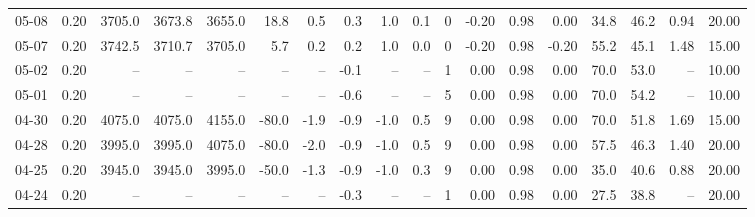 \begin{threeparttable}
{\begin{tabular}{lrrrrrrrrrrrrrrrrr}
  05-08 &     0.20 & 3705.0 & 3673.8 & 3655.0 &       18.8 &            0.5 &                       0.3 &                      1.0 &                 0.1 &              0 &      -0.20 &      0.98 &           0.00 &             34.8 &                46.2 &            0.94 &                  20.00 \\
  05-07 &     0.20 & 3742.5 & 3710.7 & 3705.0 &        5.7 &            0.2 &                       0.2 &                      1.0 &                 0.0 &              0 &      -0.20 &      0.98 &          -0.20 &             55.2 &                45.1 &            1.48 &                  15.00 \\
  05-02 &     0.20 &     -- &     -- &     -- &         -- &             -- &                      -0.1 &                       -- &                  -- &              1 &       0.00 &      0.98 &           0.00 &             70.0 &                53.0 &              -- &                  10.00 \\
  05-01 &     0.20 &     -- &     -- &     -- &         -- &             -- &                      -0.6 &                       -- &                  -- &              5 &       0.00 &      0.98 &           0.00 &             70.0 &                54.2 &              -- &                  10.00 \\
  04-30 &     0.20 & 4075.0 & 4075.0 & 4155.0 &      -80.0 &           -1.9 &                      -0.9 &                     -1.0 &                 0.5 &              9 &       0.00 &      0.98 &           0.00 &             70.0 &                51.8 &            1.69 &                  15.00 \\
  04-28 &     0.20 & 3995.0 & 3995.0 & 4075.0 &      -80.0 &           -2.0 &                      -0.9 &                     -1.0 &                 0.5 &              9 &       0.00 &      0.98 &           0.00 &             57.5 &                46.3 &            1.40 &                  20.00 \\
  04-25 &     0.20 & 3945.0 & 3945.0 & 3995.0 &      -50.0 &           -1.3 &                      -0.9 &                     -1.0 &                 0.3 &              9 &       0.00 &      0.98 &           0.00 &             35.0 &                40.6 &            0.88 &                  20.00 \\
  04-24 &     0.20 &     -- &     -- &     -- &         -- &             -- &                      -0.3 &                       -- &                  -- &              1 &       0.00 &      0.98 &           0.00 &             27.5 &                38.8 &              -- &                  20.00 \\

\end{tabular}}
\end{threeparttable}
